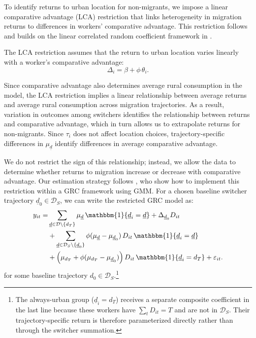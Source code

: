 \documentclass[12pt]{article}
\begin{document}
To identify returns to urban location for non-migrants, we impose a linear comparative advantage (LCA) restriction that links heterogeneity in migration returns to differences in workers' comparative advantage.
This restriction follows \cite{suriSelectionComparativeAdvantage2011} and builds on the linear correlated random coefficient framework in \cite{lemieuxEstimatingEffectsUnions1998}.

The LCA restriction assumes that the return to urban location varies linearly with a worker's comparative advantage:
\begin{equation}\label{eq:LCA-restriction}
\Delta_i = \beta + \phi\,\theta_i .
\end{equation}

Since comparative advantage also determines average rural consumption in the model, the LCA restriction implies a linear relationship between average returns and average rural consumption across migration trajectories.
As a result, variation in outcomes among switchers identifies the relationship between returns and comparative advantage, which in turn allows us to extrapolate returns for non-migrants.
Since $\tau_i$ does not affect location choices, trajectory-specific differences in $\mu_{\underline{d}}$ identify differences in average comparative advantage.

We do not restrict the sign of this relationship; instead, we allow the data to determine whether returns to migration increase or decrease with comparative advantage.
Our estimation strategy follows \cite{tjernstromCommentSuri2011}, who show how to implement this restriction within a GRC framework using GMM.
For a chosen baseline switcher trajectory $\underline d_0 \in \mathcal D_S$, we can write the restricted GRC model as:
\begin{align}
    y_{it} =& \sum_{\underline d \in \mathcal D \setminus \{d_T\}}
    \mu_{\underline d}\,\mathbbm{1}\{\underline d_i=\underline d\} + \Delta_{\underline d_0} D_{it} \nonumber \\
    & + \sum_{\underline d \in \mathcal D_S \setminus \{\underline d_0\}}
    \phi(\mu_{\underline d}-\mu_{\underline d_0})\,D_{it}\,\mathbbm{1}\{\underline d_i=\underline d\} \nonumber\\
    & + \Big(\mu_{d_T}+\phi(\mu_{d_T}-\mu_{\underline d_0})\Big)\,D_{it}\,\mathbbm{1}\{\underline d_i=d_T\} + \varepsilon_{it}.
    \label{eq:restricted-GRC}
\end{align} 
\noindent for some baseline trajectory $d_{0} \in \mathcal{D}_{S}$.\footnote{The always-urban group ($\underline d_i = d_T$) receives a separate composite coefficient in the last line because these workers have $\sum_t D_{it} = T$ and are not in $\mathcal D_S$.
Their trajectory-specific return is therefore parameterized directly rather than through the switcher summation.}
\end{document}
